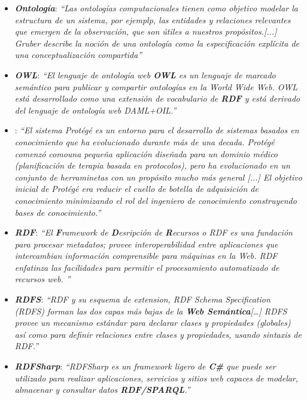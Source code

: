 \begin{itemize}
    \item \textbf{\textit{Ontología}}: \textit{“Las ontologías computacionales tienen como objetivo 
    modelar la estructura de un sistema, por ejemplp, las entidades y relaciones relevantes que emergen 
    de la observación, que son útiles a nuestros propósitos.[...] Gruber \autocite*{Gruber1995} describe la noción de una ontología 
    como la especificación explícita de una conceptualización compartida”} \autocite*{Guarino2009}

    \item \textbf{\textit{OWL}}: \textit{“El lenguaje de ontología web \textbf{OWL} es un lenguaje de marcado semántico para publicar
    y compartir ontologías en la World Wide Web. OWL está desarrollado como una extensión de vocabulario de \textbf{RDF} y está 
    derivado del lenguaje de ontología web DAML+OIL.”} \autocite*{Bechhofer2004}

    \item \textbf{\protege}: \textit{“El sistema Protégé es un entorno para el desarrollo de sistemas basados en 
    conocimiento que ha evolucionado durante más de una decada. Protégé comenzó comouna pequeña aplicación diseñada para un 
    dominio médico (planificación de terapia basada en protocolos), pero ha evolucionado en un conjunto de herraminetas con un 
    propósito mucho más general [...] El objetivo inicial de Protégé era reducir el cuello de botella de adquisición de conocimiento
    minimizando el rol del ingeniero de conocimiento construyendo bases de conocimiento.”} \autocite*{Gennari2003}

    \item \textbf{\textit{RDF}}: \textit{“El \textbf{F}ramework de \textbf{D}esripción de \textbf{R}ecursos o RDF es una fundación para 
    procesar metadatos; provee interoperabilidad entre aplicaciones que intercambian información comprensible para máquinas en la Web.
    RDF enfatinza las facilidades para permitir el procesamiento automatizado de recursos web. ”} \autocite*{Lassila1999}

    \item \textbf{\textit{RDFS}}: \textit{“RDF y su esquema de extension, RDF Schema Specification (RDFS) forman las dos capas más 
    bajas de la \textbf{Web Semántica}[\dots] RDFS provee un mecanismo estándar para declarar clases y propiedades (globales) así como 
    para definir relaciones entre clases y propiedades, usando sintaxis de RDF.”} \autocite*{Kaoudi2008}

    \item \textbf{\textit{RDFSharp}}: \textit{“RDFSharp es un framework ligero de \textbf{C\#} que puede ser utilizado para 
    realizar aplicaciones, servicios y sitios web capaces de modelar, almacenar y consultar datos \textbf{RDF/SPARQL}.”} 
    \autocite*{DeSalvo41}


\end{itemize}
